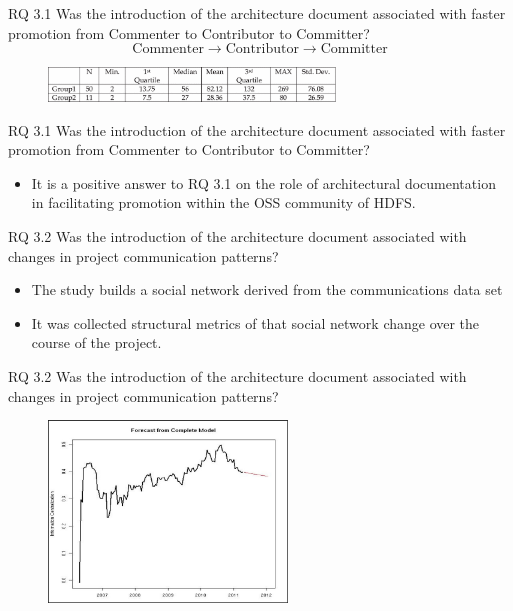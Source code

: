\documentclass[t,14pt,mathserif]{beamer}
\begin{document}
\begin{frame}{RQ 3.1 Was the introduction of the architecture document associated with faster promotion from Commenter to Contributor to Committer?}
	\begin{equation} \mathrm{Commenter} \to \mathrm{Contributor} \to \mathrm{Committer} \end{equation}

    \begin{figure}[!t]
    	\centering
    	\includegraphics[width=3.0in]{../img/promotion-table}
    	\label{fig:promotion-table}
    \end{figure}
	
\end{frame}

\begin{frame}{RQ 3.1 Was the introduction of the architecture document associated with faster promotion from Commenter to Contributor to Committer?}
	
	\begin{itemize}
		\item It is a positive answer to RQ 3.1 on the role of architectural documentation in facilitating promotion within the OSS community of HDFS.
	\end{itemize}

\end{frame}

\begin{frame}{RQ 3.2 Was the introduction of the architecture document associated with changes in project communication patterns?}
	
	\begin{itemize}
		\item The study builds a social network derived from the communications data set
		\item It was collected structural metrics of that social network change over the course of the project.
	\end{itemize}
	
\end{frame}

\begin{frame}{RQ 3.2 Was the introduction of the architecture document associated with changes in project communication patterns?}
	
	\begin{figure}[!t]
		\centering
		\includegraphics[width=2.5in]{../img/centrality}
		\label{fig:promotion-table}
	\end{figure}
		
\end{frame}
\end{document}
